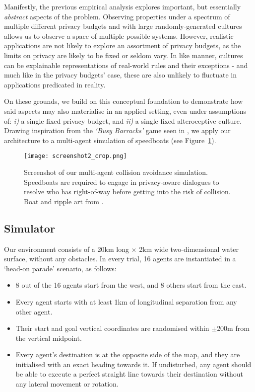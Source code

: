 \documentclass[acmsmall]{custom-arxiv}  %
\begin{document}
Manifestly, the previous empirical analysis explores important, but essentially \textit{abstract} aspects of the problem. Observing properties under a spectrum of multiple different privacy budgets and with large randomly-generated cultures allows us to observe a space of multiple possible systems. However, realistic applications are not likely to explore an assortment of privacy budgets, as the limits on privacy are likely to be fixed or seldom vary. In like manner, cultures can be explainable representations of real-world rules and their exceptions - and much like in the privacy budgets' case, these are also unlikely to fluctuate in applications predicated in reality.

On these grounds, we build on this conceptual foundation to demonstrate how said aspects may also materialise in an applied setting, even under assumptions of: \textit{i)} a single fixed privacy budget, and \textit{ii)} a single fixed alteroceptive culture. Drawing inspiration from the \textit{`Busy Barracks'} game seen in \citep{Raymond2020Culture-BasedDeconfliction}, we apply our architecture to a multi-agent simulation of speedboats (see Figure~\ref{fig:simulator}). 

\begin{figure}
\texttt{[image: screenshot2\_crop.png]}
\caption{Screenshot of our multi-agent collision avoidance simulation. Speedboats are required to engage in privacy-aware dialogues to resolve who has right-of-way before getting into the risk of collision. Boat and ripple art from \citep{Felvegi2013ShipsEffect}.}
\label{fig:simulator}
\end{figure}

\subsection{Simulator}

Our environment consists of a 20km long $\times$ 2km wide two-dimensional water surface, without any obstacles. In every trial, 16 agents are instantiated in a `head-on parade' scenario, as follows:
\begin{itemize}
    \item 8 out of the 16 agents start from the west, and 8 others start from the east.
    \item Every agent starts with at least 1km of longitudinal separation from any other agent.
    \item Their start and goal vertical coordinates are randomised within $\pm$200m from the vertical midpoint.
    \item Every agent's destination is at the opposite side of the map, and they are initialised with an exact heading towards it. If undisturbed, any agent should be able to execute a perfect straight line towards their destination without any lateral movement or rotation.
\end{itemize}
\end{document}
